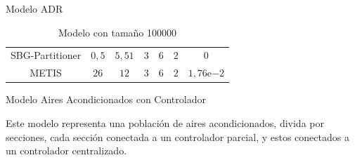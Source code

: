 \begin{frame}{Modelo ADR}
\begin{table}[H]
{\begin{tabular}{*{7}{c}}
        \midrule
        SBG-Partitioner & $0,5$ & $5,51$ & $3$ & $6$ & $2$ & $0$ \\
        METIS & $26$ & $12$ & $3$ & $6$ & $2$ & $1,76\mathrm{e}{-2}$ \\
        \bottomrule
        \end{tabular}}
        \caption{Modelo con tamaño 100000}
    \end{table}

\end{frame}


\begin{frame}{Modelo Aires Acondicionados con Controlador}

Este modelo representa una población de aires acondicionados, divida por secciones,
cada sección conectada a un controlador parcial, y estos conectados a un controlador
centralizado.

\begin{table}[H]
    \centering
    \caption{Modelo con tamaño 100000}
\end{table}

\begin{table}[H]
    \centering
\end{table}
\end{frame}
